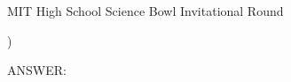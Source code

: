 \documentclass[12pt]{article}
\begin{document}
\begin{center}
\begin{huge}
MIT High School Science Bowl Invitational Round \roundnumber
\end{huge}
\end{center}

{
\ifodd\thecsvrow\filbreak\fi

\begin{center}
{\textbf{\MakeUppercase{\tb}}}
\end{center}
)  \MakeUppercase{\cat} \textit{\mcsa} \question

\vspace{5pt}
ANSWER: \answer \vspace{15pt}

\ifodd\thecsvrow\else\hrulefill\fi
}
\end{document}
